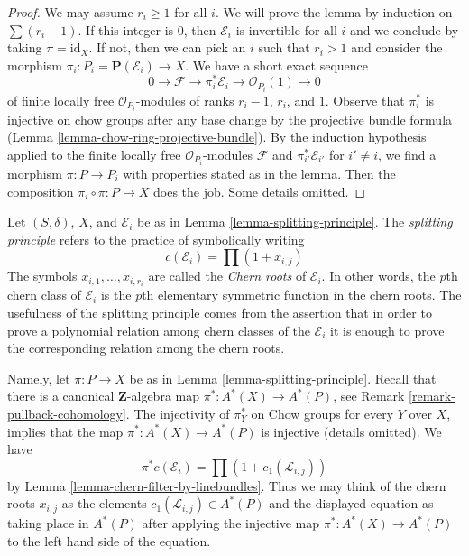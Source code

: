 \begin{proof}
We may assume $r_i \geq 1$ for all $i$. We will prove the lemma by induction
on $\sum (r_i - 1)$. If this integer is $0$, then $\mathcal{E}_i$
is invertible for all $i$ and we conclude by taking $\pi = \text{id}_X$.
If not, then we can pick an $i$ such that $r_i > 1$ and consider the
morphism $\pi_i : P_i = \mathbf{P}(\mathcal{E}_i) \to X$.
We have a short exact sequence
$$
0 \to \mathcal{F} \to \pi_i^*\mathcal{E}_i \to \mathcal{O}_{P_i}(1) \to 0
$$
of finite locally free $\mathcal{O}_{P_i}$-modules of ranks $r_i - 1$,
$r_i$, and $1$. Observe that $\pi_i^*$ is injective on chow groups
after any base change by the projective bundle formula
(Lemma \ref{lemma-chow-ring-projective-bundle}).
By the induction hypothesis applied to the finite locally free
$\mathcal{O}_{P_i}$-modules $\mathcal{F}$ and $\pi_{i'}^*\mathcal{E}_{i'}$
for $i' \not = i$, we find a morphism $\pi : P \to P_i$ with
properties stated as in the lemma. Then the composition
$\pi_i \circ \pi : P \to X$ does the job. Some details omitted.
\end{proof}

\noindent
Let $(S, \delta)$, $X$, and $\mathcal{E}_i$ be as in
Lemma \ref{lemma-splitting-principle}.
The {\it splitting principle} refers to the practice of symbolically writing
$$
c(\mathcal{E}_i) = \prod (1 + x_{i, j})
$$
The symbols $x_{i, 1}, \ldots, x_{i, r_i}$ are called the {\it Chern roots}
of $\mathcal{E}_i$. In other words, the $p$th chern class of $\mathcal{E}_i$
is the $p$th elementary symmetric function in the chern roots.
The usefulness of the splitting principle comes from the assertion that
in order to prove a polynomial relation among chern classes of the
$\mathcal{E}_i$ it is enough to prove the corresponding relation among the
chern roots.

\medskip\noindent
Namely, let $\pi : P \to X$ be as in Lemma \ref{lemma-splitting-principle}.
Recall that there is a canonical $\mathbf{Z}$-algebra map
$\pi^* : A^*(X) \to A^*(P)$, see
Remark \ref{remark-pullback-cohomology}. The injectivity of $\pi_Y^*$
on Chow groups for every $Y$ over $X$, implies that the map
$\pi^* : A^*(X) \to A^*(P)$ is injective (details omitted).
We have
$$
\pi^*c(\mathcal{E}_i) = \prod (1 + c_1(\mathcal{L}_{i, j}))
$$
by Lemma \ref{lemma-chern-filter-by-linebundles}. Thus we may think of the
chern roots $x_{i, j}$ as the elements $c_1(\mathcal{L}_{i, j}) \in A^*(P)$
and the displayed equation as taking place in $A^*(P)$ after
applying the injective map $\pi^* : A^*(X) \to A^*(P)$ to the left
hand side of the equation.

